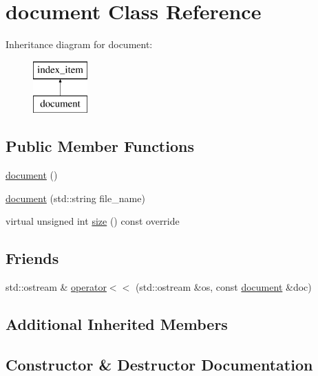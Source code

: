 \hypertarget{classdocument}{}\section{document Class Reference}
\label{classdocument}
Inheritance diagram for document\+:\begin{figure}[H]
\begin{center}
\leavevmode
\includegraphics[height=2.000000cm]{classdocument}
\end{center}
\end{figure}
\subsection*{Public Member Functions}
\begin{DoxyCompactItemize}
\item 
\hyperlink{classdocument_af1a85718219b8da6f1befaac0bf87989}{document} ()
\item 
\hyperlink{classdocument_a206a0d6fdb94c618048da73226358ab4}{document} (std\+::string file\+\_\+name)
\item 
virtual unsigned int \hyperlink{classdocument_a45717a4aeff4409b769f0c6f9f72a6f1}{size} () const override
\end{DoxyCompactItemize}
\subsection*{Friends}
\begin{DoxyCompactItemize}
\item 
std\+::ostream \& \hyperlink{classdocument_af474a7f5ba29bca5df031898e86a8687}{operator$<$$<$} (std\+::ostream \&os, const \hyperlink{classdocument}{document} \&doc)
\end{DoxyCompactItemize}
\subsection*{Additional Inherited Members}


\subsection{Constructor \& Destructor Documentation}
\mbox{\label{classdocument_af1a85718219b8da6f1befaac0bf87989}} 
